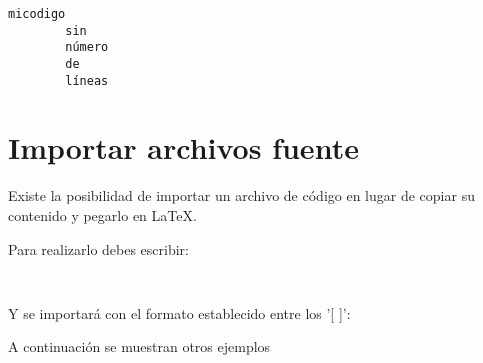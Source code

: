 \begin{lstlisting}[style=Python,numbers=none,title={Ejemplo de código sin número de líneas}]
		micodigo
		sin
		número
		de
		líneas
\end{lstlisting}

\section{Importar archivos fuente}

Existe la posibilidad de importar un archivo de código en lugar de copiar su contenido y pegarlo en \LaTeX.

Para realizarlo debes escribir:

\begin{lstlisting}[style=Latex-color]
	
\end{lstlisting}

Y se importará con el formato establecido entre los '[ ]':
\newpage


A continuación se muestran otros ejemplos

\begin{lstlisting}[style=Latex-color]
	
\end{lstlisting}

	

\begin{lstlisting}[style=Latex-color]
	
\end{lstlisting}



